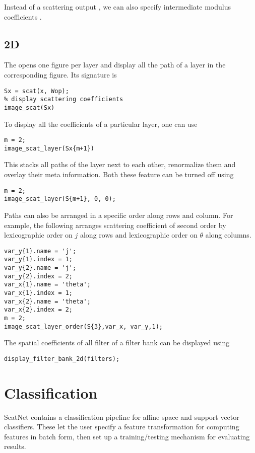 \documentclass{article}
\begin{document}
Instead of a scattering output , we can also specify intermediate modulus coefficients .

\subsection{2D}

The  opens one figure per layer and display all the path of a layer in the corresponding figure. Its signature is 
\begin{lstlisting}
Sx = scat(x, Wop);
% display scattering coefficients
image_scat(Sx)
\end{lstlisting}

To display all the coefficients of a particular layer, one can use 
\begin{lstlisting}
m = 2;
image_scat_layer(Sx{m+1})
\end{lstlisting}
This stacks all paths of the layer next to each other, renormalize them and overlay their meta information. Both these feature can be turned off using
\begin{lstlisting}
m = 2;
image_scat_layer(S{m+1}, 0, 0);
\end{lstlisting}
Paths can also be arranged in a specific order along rows and column.
For example, the following arranges scattering coefficient of second order
by lexicographic order on $j$ along rows and lexicographic order on $\theta$ along columns.
\begin{lstlisting}
var_y{1}.name = 'j';
var_y{1}.index = 1;
var_y{2}.name = 'j';
var_y{2}.index = 2;
var_x{1}.name = 'theta';
var_x{1}.index = 1;
var_x{2}.name = 'theta';
var_x{2}.index = 2;
m = 2;
image_scat_layer_order(S{3},var_x, var_y,1);
\end{lstlisting}
The spatial coefficients of all filter of a filter bank can be displayed using
\begin{lstlisting}
display_filter_bank_2d(filters);
\end{lstlisting}

\section{Classification \label{sec:classification}}

ScatNet contains a classification pipeline for affine space and support vector classifiers. These let the user specify a feature transformation for computing features in batch form, then set up a training/testing mechanism for evaluating results.
\end{document}
